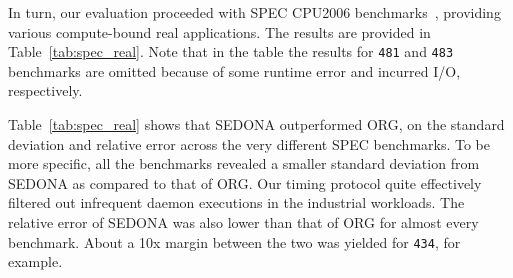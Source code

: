 \documentclass[letter]{ieice}
\begin{document}
In turn, our evaluation proceeded with SPEC CPU2006 
benchmarks~\cite{specCpu2006}, providing various \linebreak 
\hbox{compute-bound} real applications. The results are \hbox{provided} in Table~\ref{tab:spec_real}. 
Note that in the table the results for {\tt 481} and {\tt 483} \hbox{benchmarks} 
are omitted because of some runtime error and incurred I/O, respectively.

{\color{blue}
Table~\ref{tab:spec_real} shows that 
SEDONA outperformed ORG,
on the standard deviation and relative error across the very different SPEC benchmarks. 
To be more specific, all the benchmarks revealed a smaller standard deviation 
from SEDONA as compared to that of ORG. 
Our timing protocol quite effectively filtered out infrequent daemon executions 
in the industrial workloads. The relative error of SEDONA was also 
lower than that of ORG for almost every benchmark.
{\color{red}About a 10x \hbox{margin} between the two was yielded for {\tt 434}, for example.}
}
\end{document}
